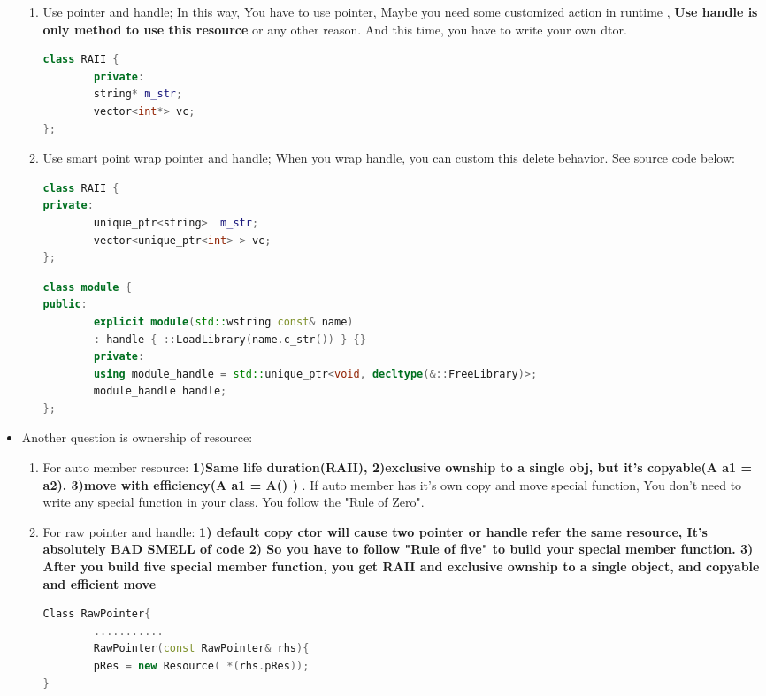 \documentclass[a4paper,11pt,twoside]{book}
\begin{document}
\begin{itemize}
\begin{enumerate}
		\item Use pointer and handle; In this way, You have to use pointer, Maybe you need some customized action in runtime , \textbf{Use handle is only method to use this resource} or any other reason. And this time, you have to write your own dtor.
\begin{lstlisting}[frame=single, language=c++]
class RAII {
		private:
		string* m_str;
		vector<int*> vc;
};
\end{lstlisting}
		
		\item Use smart point wrap pointer and handle; When you wrap handle, you can custom this delete behavior. See source code below:
\begin{lstlisting}[frame=single, language=c++]
class RAII {
private:
		unique_ptr<string>  m_str;
		vector<unique_ptr<int> > vc;
};
\end{lstlisting}
		
\begin{lstlisting}[frame=single, language=c++]
class module {
public:
		explicit module(std::wstring const& name)
		: handle { ::LoadLibrary(name.c_str()) } {}
		private:
		using module_handle = std::unique_ptr<void, decltype(&::FreeLibrary)>;
		module_handle handle;
};
\end{lstlisting}
	\end{enumerate}
	
	\item Another question is ownership of resource:
	\begin{enumerate}
		\item For auto member resource: \textbf{1)Same life duration(RAII), 2)exclusive ownship to a single obj, but it's copyable(A a1 = a2).  3)move with efficiency(A a1 = A() ) }. If auto member has it's own copy and move special function, You don't need to write any special function in your class. You follow the "Rule of Zero".
		
		\item For raw pointer and handle: \textbf{1) default copy ctor will cause two pointer or handle refer the same resource, It's absolutely BAD SMELL of code 2) So you have to follow "Rule of five" to build your special member function. 3) After you build five special member function, you get RAII and exclusive ownship to a single object, and copyable and efficient move}
\begin{lstlisting}[frame=single, language=c++]
Class RawPointer{
		...........
		RawPointer(const RawPointer& rhs){
		pRes = new Resource( *(rhs.pRes));
}
		

\end{lstlisting}
\end{enumerate}
\end{itemize}
\end{document}
